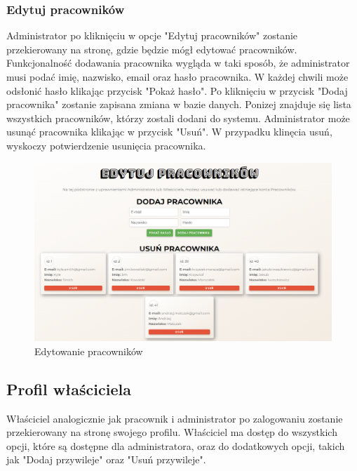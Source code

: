 \subsubsection{Edytuj pracowników}
\noindent Administrator po kliknięciu w opcje "Edytuj pracowników" zostanie przekierowany na stronę,
gdzie będzie mógł edytować pracowników. Funkcjonalność dodawania pracownika
 wygląda w taki sposób, że administrator musi podać imię, nazwisko, email oraz hasło pracownika. 
 W każdej chwili może odsłonić hasło klikając przycisk "Pokaż hasło". Po kliknięciu 
 w przycisk "Dodaj pracownika" zostanie zapisana zmiana w bazie danych. Ponizej 
 znajduje się lista wszystkich pracowników, którzy zostali dodani do systemu.
  Administrator może usunąć pracownika klikając w przycisk "Usuń". W przypadku klinęcia usuń, wyskoczy 
  potwierdzenie usunięcia pracownika.
\begin{figure}[h]
    \centering
    \includegraphics[scale=0.48]{photos/edytowanie_pracownikow.png}
    \caption{Edytowanie pracowników}
    \label{fig:login}

\end{figure}

\newpage

\subsection{Profil właściciela}
\noindent Właściciel analogicznie jak pracownik i administrator po zalogowaniu zostanie 
przekierowany na stronę swojego profilu. Właściciel ma dostęp do wszystkich opcji, które są dostępne 
dla administratora, oraz do dodatkowych opcji, takich jak "Dodaj przywileje" oraz "Usuń przywileje".

